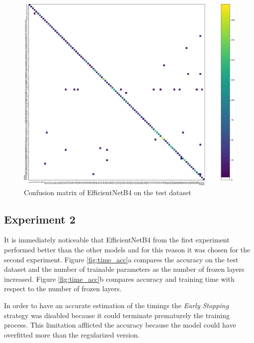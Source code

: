 \begin{figure}[ht!]
\centering
\includegraphics[width=1\textwidth]{images/cm.png} 
\caption{Confusion matrix of EfficientNetB4 on the test dataset}
\label{fig:cm}
\end{figure}

\subsection{Experiment 2}


It is immediately noticeable that EfficientNetB4 from the first experiment performed better than the other models and for this reason it was chosen for the second experiment. Figure \ref{fig:time_acc}a compares the accuracy on the test dataset and the number of trainable parameters as the number of frozen layers increased. Figure \ref{fig:time_acc}b compares accuracy and training time with respect to the number of frozen layers. \par 
In order to have an accurate estimation of the timings the \textit{Early Stopping} strategy was disabled because it could terminate prematurely the training process. This limitation afflicted the accuracy because the model could have overfitted more than the regularized version.




